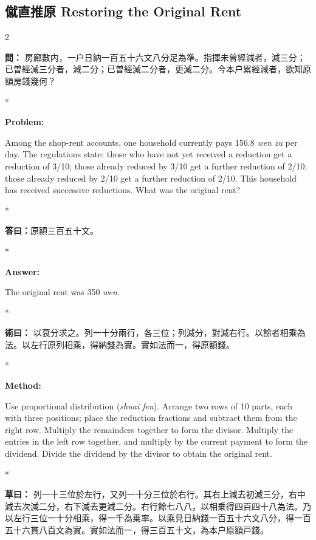\documentclass[11pt,a4paper]{article}
\newcommand{\CnQuestion}[1]{\par\noindent\textbf{\color{problemcolor}問：}#1\par\vspace{0.5ex}}
\newcommand{\CnAnswer}[1]{\par\noindent\textbf{\color{answercolor}答曰：}#1\par\vspace{0.5ex}}
\newcommand{\CnMethod}[1]{\par\noindent\textbf{\color{methodcolor}術曰：}#1\par\vspace{0.5ex}}
\newcommand{\CnWorking}[1]{\par\noindent\textbf{草曰：}#1\par\vspace{0.5ex}}
\newcommand{\EnQuestion}{\par\noindent\textbf{\color{problemcolor}Problem:}\par\vspace{0.5ex}}
\newcommand{\EnAnswer}{\par\noindent\textbf{\color{answercolor}Answer:}\par\vspace{0.5ex}}
\newcommand{\EnMethod}{\par\noindent\textbf{\color{methodcolor}Method:}\par\vspace{0.5ex}}
\newcommand{\switchCn}{\switchcolumn[0]*}
\newcommand{\switchEn}{\switchcolumn[1]*}
\begin{document}
\vspace{1em}

\subsection*{僦直推原 \quad Restoring the Original Rent}

\begin{paracol}{2}

\CnQuestion{%
房廊數内，一户日納一百五十六文八分足為準。指揮未曽經減者，減三分；已曽經減三分者，減二分；已曽經減二分者，更減二分。今本户累經減者，欲知原額房錢幾何？
}

\switchEn

\EnQuestion
Among the shop-rent accounts, one household currently pays 156.8 \textit{wen} \textit{zu} per day. The regulations state: those who have not yet received a reduction get a reduction of 3/10; those already reduced by 3/10 get a further reduction of 2/10; those already reduced by 2/10 get a further reduction of 2/10. This household has received successive reductions. What was the original rent?

\switchCn

\CnAnswer{原額三百五十文。}

\switchEn

\EnAnswer The original rent was 350 \textit{wen}.

\switchCn

\CnMethod{%
以衰分求之。列一十分兩行，各三位；列減分，對減右行。以餘者相乘為法。以左行原列相乘，得納錢為實。實如法而一，得原額錢。
}

\switchEn

\EnMethod
Use proportional distribution (\textit{shuai fen}). Arrange two rows of 10 parts, each with three positions; place the reduction fractions and subtract them from the right row. Multiply the remainders together to form the divisor. Multiply the entries in the left row together, and multiply by the current payment to form the dividend. Divide the dividend by the divisor to obtain the original rent.

\switchCn

\CnWorking{%
列一十三位於左行，又列一十分三位於右行。其右上減去初減三分，右中減去次減二分，右下減去更減二分。右行餘七八八，以相乗得四百四十八為法。乃以左行三位一十分相乘，得一千為乗率。以乘見日納錢一百五十六文八分，得一百五十六貫八百文為實。實如法而一，得三百五十文，為本户原額戸錢。
}


\end{paracol}
\end{document}
